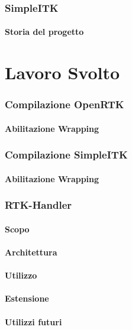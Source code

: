 \documentclass[a4paper,11pt, oneside]{article}
\begin{document}
            
        \section{SimpleITK}
            \subsection{Storia del progetto}
        
    \part{Lavoro Svolto}
        \section{Compilazione OpenRTK}
            \subsection{Abilitazione Wrapping}
        \section{Compilazione SimpleITK}
            \subsection{Abilitazione Wrapping}
        \section{RTK-Handler}
            \subsection{Scopo}
            \subsection{Architettura}
            \subsection{Utilizzo}
            \subsection{Estensione}
            \subsection{Utilizzi futuri}
            
\end{document}
